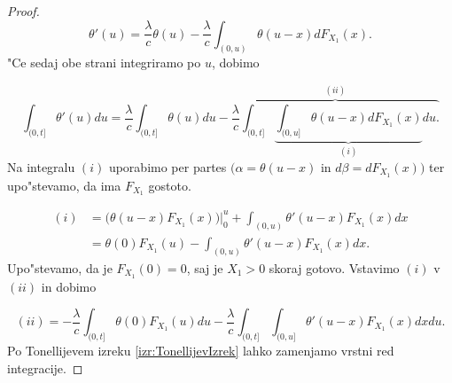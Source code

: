 \documentclass[12pt, a4paper, reqno]{amsart}
\theoremstyle{definition}
\theoremstyle{plain}
\newcommand{\1}{\mathds{1}}
\newcommand*{\refPriloga}[1]{%
  \begingroup
    \hypersetup{
      linkcolor=red,
      linkbordercolor=red,
    }%
    \ref{#1}%
  \endgroup
}
\begin{document}
\begin{proof}
        \begin{equation*}
            \theta'(u) = \frac{\lambda}{c}\theta(u) - \frac{\lambda}{c}\int_{(0, u)}\theta(u - x)dF_{X_1}(x).
        \end{equation*}
        "Ce sedaj obe strani integriramo po $u$, dobimo
        
        \begin{equation}
            \int_{(0, t]}\theta'(u)du = \frac{\lambda}{c}\int_{(0, t]}\theta(u)du - \overbrace{\frac{\lambda}{c}\int_{(0, t]}\underbrace{\int_{(0, u]}\theta(u - x)dF_{X_1}(x)}_{(i)}du.}^{(ii)} 
            \label{eq:verjetnostPrezivetjaIntegral}
        \end{equation}
        Na integralu $(i)$ uporabimo per partes $\bigl(\alpha = \theta(u-x)$ in $d\beta = dF_{X_1}(x)\bigr)$ 
        ter upo"stevamo, da ima $F_{X_1}$ gostoto.

        \begin{align*}
            (i)     &= \bigl(\theta(u - x)F_{X_1}(x)\bigr)\Big|_{0}^{u} + \int_{(0, u)}\theta'(u - x)F_{X_1}(x)dx \\
                    &= \theta(0)F_{X_1}(u) - \int_{(0, u)}\theta'(u - x)F_{X_1}(x)dx.
        \end{align*}
        Upo"stevamo, da je $F_{X_1}(0) = 0$, saj je $X_1 > 0$ skoraj gotovo. Vstavimo $(i)$ 
        v $(ii)$ in dobimo

        \begin{equation*}
            (ii) =  - \frac{\lambda}{c}\int_{(0, t]}\theta(0)F_{X_1}(u)du - \frac{\lambda}{c}\int_{(0, t]}\int_{(0, u]}\theta'(u - x)F_{X_1}(x)dxdu. 
        \end{equation*}
        Po Tonellijevem izreku \refPriloga{izr:TonellijevIzrek} lahko zamenjamo vrstni red integracije.


\end{proof}
\end{document}
